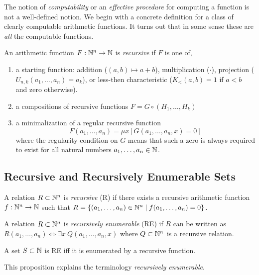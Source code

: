 \documentclass[12pt]{article}
\renewcommand{\eq}[1]{\exists{#1} \:}
\begin{document}
The notion of \textit{computability} or an \textit{effective procedure} for computing a function is not a well-defined notion. 
We begin with a concrete definition for a class of clearly computable arithmetic functions. It turns out that in some sense these are \textit{all} the computable functions. 

\begin{definition}
An arithmetic function $F : \mathbb{N}^n \to \mathbb{N}$ is \textit{recursive} if $F$ is one of,
\begin{enumerate}
\item a starting function: addition ($(a,b) \mapsto a+b$), multiplication ($\cdot$), projection ($U_{n,k}(a_1, \dots, a_n) = a_k$), or less-then characteristic ($K_{<}(a,b) = 1$ if $a < b$ and zero otherwise).
\item a compositions of recursive functions $F = G \circ (H_1, \dots, H_k)$
\item a minimalization of a regular recursive function \[ F(a_1, \dots, a_n) = \mu x [G(a_1, \dots, a_n, x) = 0] \] where the regularity condition on $G$ means that such a zero is always required to exist for all natural numbers $a_1, \dots, a_n \in \mathbb{N}$. 
\end{enumerate}
\end{definition}


\subsection{Recursive and Recursively Enumerable Sets}

\begin{definition}
A relation $R \subset \mathbb{N}^n$ is \textit{recursive} (R) if there exists a recursive arithmetic function $f : \mathbb{N}^n \to \mathbb{N}$ such that $R = \{ (a_1, \dots, a_n) \in \mathbb{N}^n \mid f(a_1, \dots, a_n) = 0\}$.
\end{definition}

\begin{definition}
A relation $R \subset \mathbb{N}^n$ is \textit{recursively enumerable} (RE) if $R$ can be written as $R(a_1, \dots, a_n) \iff \eq{x} Q(a_1, \dots, a_n, x)$ where $Q \subset \mathbb{N}^n$ is a recursive relation.
\end{definition}

\begin{proposition}
A set $S \subset \mathbb{N}$ is RE iff it is enumerated by a recursive function.
\end{proposition}

\begin{remark}
This proposition explains the terminology \textit{recursively enumerable}.
\end{remark}
\end{document}
